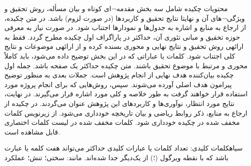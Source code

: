 \begin{ParsaAbstractParsi}
    محتویات چکیده شامل سه بخش مقدمه¬ای کوتاه و بیان مسأله، روش تحقیق و ویژگی¬های آن و نهایتا نتایج تحقیق و کاربردها (در صورت لزوم) باشد. در متن چکیده، از ارجاع به منابع و اشاره به جدول‌ها و نمودارها اجتناب شود. در صورت نیاز به معرفی حوزه تحقیق و مبانی تئوری آن، حداکثر در پاراگراف اول چکیده مطرح گردد. فقط به ارائهی روش تحقیق و نتایج نهایی و محوری بسنده کرده و از ارائهی موضوعات و نتایج كلی اجتناب شود. كلمات یا عباراتی كه در این بخش توضیح داده می‌شود، باید كاملاً محوری و مرتبط با موضوع تحقیق باشند. متن چکیده حداکثر یک صفحه باشد. جمله اول چکیده بیان‌کننده هدف نهایی از انجام پژوهش است. جملات بعدی به منظور توضیح پیرامون هدف اصلی آورده می‌شوند. سپس، روش‌هایی که برای انجام پروژه مورد استفاده قرار خواهند گرفت به طور خلاصه و کلی مورد اشاره قرار می‌گیرند. در نهایت، نتایج مورد انتظار، نوآوری‌ها و کاربردهای این پژوهش عنوان می‌گردند. در چكیده از ارجاع به منابع، ذكر روابط ریاضی و بیان تاریخچه خودداری ‌می‌شود.
    از زیرنویس کلمات مخفف شده در چکیده خودداری شود. کلمات مخفف شده در لیست کلمات اختصاری قابل مشاهده است.


    \bigskip\noindent
    ‌سیاه{کلمات کلیدی:} تعداد كلمات یا عبارات كلیدی حداكثر می‌تواند هفت كلمه یا عبارت باشد که با نقطه ویرگول (؛) از یک‌دیگر جدا شده‌اند. مانند: سختی؛ تنش؛ عملکرد
\end{ParsaAbstractParsi}
\clearpage